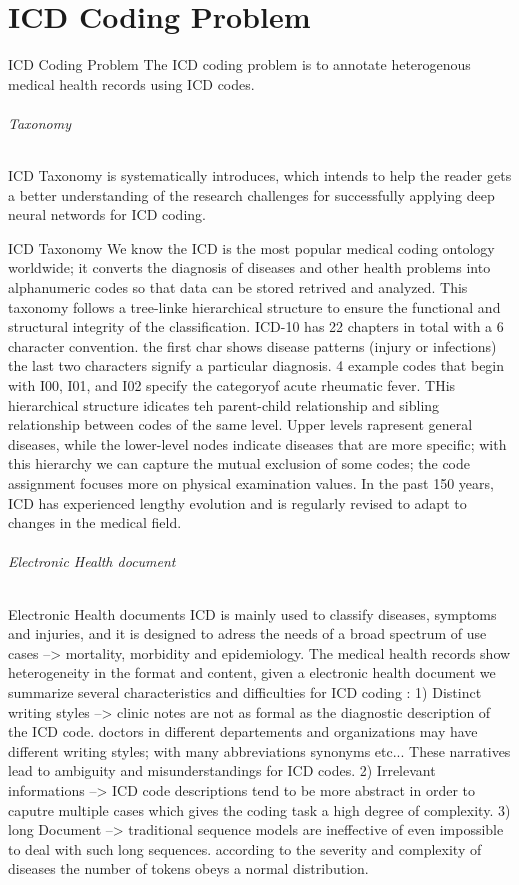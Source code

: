 \part{ICD Coding Problem}
ICD Coding Problem 
The ICD coding problem is to annotate heterogenous medical health records using ICD codes. 
\paragraph{Taxonomy}
ICD Taxonomy is systematically introduces, which intends to help the reader gets a better understanding 
of the research challenges for successfully applying deep neural networds for ICD coding. 

ICD Taxonomy 
We know the ICD is the most popular medical coding ontology worldwide; it converts the diagnosis of diseases 
and other health problems into alphanumeric codes so that data can be stored retrived and analyzed. 
This taxonomy follows a tree-linke hierarchical structure to ensure the functional and structural integrity 
of the classification. ICD-10 has 22 chapters in total with a 6 character convention. the first char shows 
disease patterns (injury or infections) the last two characters signify a particular diagnosis. 
4 example codes that begin with I00, I01, and I02 specify the categoryof acute rheumatic fever. 
THis hierarchical structure idicates teh parent-child relationship and sibling relationship between codes 
of the same level. Upper levels rapresent general diseases, while the lower-level nodes indicate diseases that 
are more specific; with this hierarchy we can capture the mutual exclusion of some codes; the  code  assignment
focuses more on physical examination values.
In the past 150 years, ICD has experienced lengthy evolution and is regularly revised to adapt to changes in the medical field. 

\paragraph{Electronic Health document}
Electronic Health documents 
ICD is mainly used to classify diseases, symptoms and injuries, and it is designed to adress the needs of a broad 
spectrum of use cases --> mortality, morbidity and epidemiology. 
The medical health records show heterogeneity in the format and content, given a electronic health document 
we summarize several characteristics and difficulties for ICD coding : 
1) Distinct writing styles --> clinic notes are not as formal as the diagnostic description of the ICD code. 
doctors in different departements and organizations may have different writing styles; with many abbreviations 
synonyms etc... These narratives lead to ambiguity and misunderstandings for ICD codes. 
2) Irrelevant informations --> ICD code descriptions tend to be more abstract in order to caputre multiple cases 
which gives the coding task a high degree of complexity. 
3) long Document --> traditional sequence models are ineffective of even impossible to deal with such long sequences. 
according to the severity and complexity of diseases the number of tokens obeys a normal distribution. 

